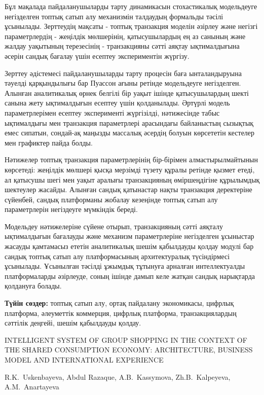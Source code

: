 Бұл мақалада пайдаланушыларды тарту динамикасын стохастикалық
модельдеуге негізделген топтық сатып алу механизмін талдаудың формальды
тәсілі ұсынылады. Зерттеудің мақсаты - топтық транзакция моделін әзірлеу
және негізгі параметрлердің - жеңілдік мөлшерінің, қатысушылардың ең аз
санының және жалдау уақытының терезесінің - транзакцияны сәтті аяқтау
ықтималдығына әсерін сандық бағалау үшін есептеу экспериментін жүргізу.

Зерттеу әдістемесі пайдаланушыларды тарту процесін баға ынталандыруына
тәуелді қарқындылығы бар Пуассон ағыны ретінде модельдеуге негізделген.
Алынған аналитикалық өрнек белгілі бір уақыт ішінде қатысушылардың шекті
санына жету ықтималдығын есептеу үшін қолданылады. Әртүрлі модель
параметрлерімен есептеу эксперименті жүргізілді, нәтижесінде табыс
ықтималдығы мен транзакция параметрлері арасындағы байланыстың сызықтық
емес сипатын, сондай-ақ маңызды массалық әсердің болуын көрсететін
кестелер мен графиктер пайда болды.

Нәтижелер топтық транзакция параметрлерінің бір-бірімен
алмастырылмайтынын көрсетеді: же\-ңілдік мөлшері қысқа мерзімді түзету
құралы ретінде қызмет етеді, ал қатысушы шегі мен уақыт аралығы
транзакцияның өміршеңдігіне құрылымдық шектеулер жасайды. Алынған сандық
қатынастар нақты транзакция деректеріне сүйенбей, сандық платформаны
жобалау кезеңінде топтық сатып алу параметрлерін негіздеуге мүмкіндік
береді.

Модельдеу нәтижелеріне сүйене отырып, транзакцияның сәтті аяқталу
ықтималдығын бағалауды және механизм параметрлеріне негізделген
ұсыныстар жасауды қамтамасыз ететін аналитикалық шешім қабылдауды қолдау
модулі бар сандық топтық сатып алу платформасының архитектуралық
түсіндірмесі ұсынылады. Ұсынылған тәсілді ұжымдық тұтынуға арналған
интеллектуалды платформаларды әзірлеуде, соның ішінде дамып келе жатқан
сандық нарықтарда қолдануға болады.

{\bfseries Түйін сөздер:} топтық сатып алу, ортақ пайдалану экономикасы,
цифрлық платформа, әлеуметтік коммерция, цифрлық платформа,
транзакциялардың сәттілік деңгейі, шешім қабылдауды қолдау.

\begin{header}
INTELLIGENT SYSTEM OF GROUP SHOPPING IN THE CONTEXT OF THE SHARED CONSUMPTION ECONOMY: ARCHITECTURE, BUSINESS MODEL AND INTERNATIONAL EXPERIENCE

R.K.~Uskenbayeva,
Abdul
Razaque,
A.B.~Kassymova\envelope,
Zh.B.~Kalpeyeva,
A.M.~Anartayeva
\end{header}

